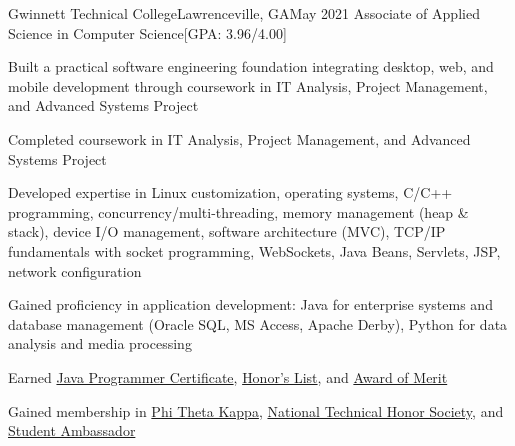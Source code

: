 \begin{resume-itemize}
  {Gwinnett Technical College}{Lawrenceville, GA}{May 2021}
  {Associate of Applied Science in Computer Science}[GPA: 3.96/4.00]
    \item Built a practical software engineering foundation integrating desktop, web, and mobile development through coursework in IT Analysis, Project Management, and Advanced Systems Project
    \item Completed coursework in IT Analysis, Project Management, and Advanced Systems Project
    \item Developed expertise in Linux customization, operating systems, 
    C/C++ programming, concurrency/multi-threading, 
    memory management (heap \& stack), device I/O management,
    software architecture (MVC), 
    TCP/IP fundamentals with socket programming, 
    WebSockets, Java Beans, Servlets, JSP, network configuration
    \item Gained proficiency in application development: Java for enterprise systems and database management (Oracle SQL, MS Access, Apache Derby), 
    Python for data analysis and media processing
    \item Earned \href{https://yundaeleesong.github.io/2105-GraduateAward-JavaProgrammer.pdf}{Java Programmer Certificate}, 
    \href{https://yundaeleesong.github.io/1911-HonorsList.pdf}{Honor's List}, and 
    \href{https://yundaeleesong.github.io/2105-MeritAward.pdf}{Award of Merit}
    \item Gained membership in \href{https://yundaeleesong.github.io/1810-membership-PhiThetaKappa.pdf}{Phi Theta Kappa}, 
    \href{https://yundaeleesong.github.io/2104-membership-NTHS.pdf}{National Technical Honor Society}, 
    and \href{https://yundaeleesong.github.io/2105-membership-Ambassador.pdf}{Student Ambassador}
\end{resume-itemize}


